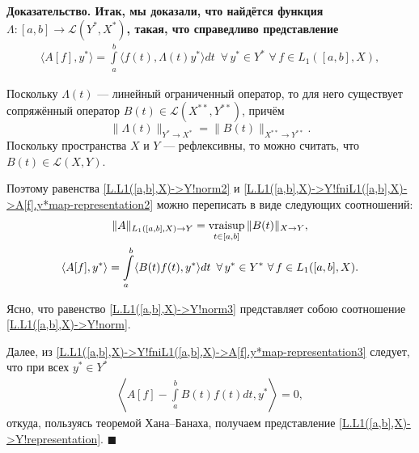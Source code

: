 \documentclass{report}
\newenvironment{Proof}{\par\noindent\bf Доказательство.\rm}{ $\blacksquare$\par}
\newcommand{\vraisup}{\mathop{\rm vraisup}}
\begin{document}
\begin{Proof}
Итак, мы доказали, что найдётся функция $\Lambda:[a,b]\to\mathcal{L}(Y^*,X^*)$, такая, что справедливо представление
\begin{gather}\label{L.L1([a,b],X)->Y!fniL1([a,b],X)->A[f].y*map-representation2}
\langle A[f],y^*\rangle=\int\limits_a^b\langle f(t),\Lambda(t)y^*\rangle dt\,\,\,\forall\,y^*\in Y^*\,\,\forall\,f\in L_1([a,b],X),
\end{gather}

Поскольку $\Lambda(t)$ --- линейный ограниченный оператор, то для него существует сопряжённый оператор $B(t)\in\mathcal{L}(X^{**},Y^{**})$, причём
$$
\|\Lambda(t)\|_{Y^*\to X^*}=\|B(t)\|_{X^{**}\to Y^{**}}.
$$
Поскольку пространства $X$ и $Y$ --- рефлексивны, то можно считать, что $B(t)\in\mathcal{L}(X,Y)$.

Поэтому равенства \eqref{L.L1([a,b],X)->Y!norm2} и \eqref{L.L1([a,b],X)->Y!fniL1([a,b],X)->A[f].y*map-representation2} можно переписать в виде следующих соотношений:
\begin{gather}
\label{L.L1([a,b],X)->Y!norm3}
\|A\|_{L_1([a,b],X)\to Y}=\vraisup\limits_{t\in[a,b]}\|B(t)\|_{X\to Y},\\
\label{L.L1([a,b],X)->Y!fniL1([a,b],X)->A[f].y*map-representation3}
\langle A[f],y^*\rangle=\int\limits_a^b\langle B(t)f(t),y^*\rangle dt\,\,\,\forall\,y^*\in Y^*\,\,\forall\,f\in L_1([a,b],X).
\end{gather}

Ясно, что равенство \eqref{L.L1([a,b],X)->Y!norm3} представляет собою соотношение \eqref{L.L1([a,b],X)->Y!norm}.

Далее, из \eqref{L.L1([a,b],X)->Y!fniL1([a,b],X)->A[f].y*map-representation3} следует, что при всех $y^*\in Y^*$
\begin{gather*}
\left\langle A[f]-\int\limits_a^bB(t)f(t)dt, y^*\right\rangle=0,
\end{gather*}
откуда, пользуясь теоремой Хана--Банаха, получаем представление \eqref{L.L1([a,b],X)->Y!representation}.
\end{Proof}
\end{document}
